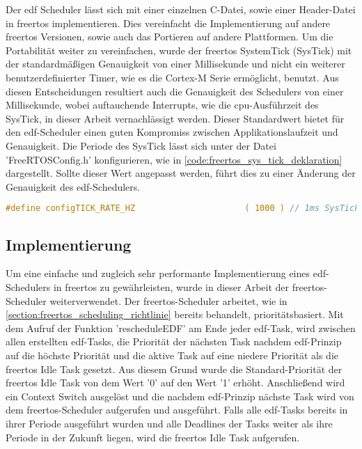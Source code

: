 \documentclass[../EDF Master Thesis.tex]{subfiles}
\begin{document}
Der \ac{edf} Scheduler lässt sich mit einer einzelnen C-Datei, sowie einer Header-Datei in \ac{freertos} implementieren.
Dies vereinfacht die Implementierung auf andere \ac{freertos} Versionen, sowie auch das Portieren auf andere Plattformen.
Um die Portabilität weiter zu vereinfachen, wurde der \ac{freertos} SystemTick (SysTick) mit der standardmäßigen Genauigkeit von einer Millisekunde und nicht ein weiterer benutzerdefinierter Timer, wie es die Cortex-M Serie ermöglicht, benutzt.
Aus diesen Entscheidungen resultiert auch die Genauigkeit des Schedulers von einer Millisekunde, wobei auftauchende Interrupts, wie die \ac{cpu}-Ausführzeit des SysTick, in dieser Arbeit vernachlässigt werden.
Dieser Standardwert bietet für den \ac{edf}-Scheduler einen guten Kompromiss zwischen Applikationslaufzeit und Genauigkeit.
Die Periode des SysTick lässt sich unter der Datei 'FreeRTOSConfig.h' konfigurieren, wie in \autoref{code:freertos_sys_tick_deklaration} dargestellt.
Sollte dieser Wert angepasst werden, führt dies zu einer Änderung der Genauigkeit des \ac{edf}-Schedulers.

\begin{lstlisting}[language=C, caption=FreeRTOS SysTick Deklaration, label=code:freertos_sys_tick_deklaration]
    #define configTICK_RATE_HZ						( 1000 ) // 1ms SysTick
\end{lstlisting}

\subsection{Implementierung} \label{section:implementierung}
    Um eine einfache und zugleich sehr performante Implementierung eines \ac{edf}-Schedulers in \ac{freertos} zu gewährleisten, wurde in dieser Arbeit der \ac{freertos}-Scheduler weiterverwendet.
    Der \ac{freertos}-Scheduler arbeitet, wie in \autoref{section:freertos_scheduling_richtlinie} bereits behandelt, prioritätsbasiert.
    Mit dem Aufruf der Funktion 'rescheduleEDF' am Ende jeder \ac{edf}-Task, wird zwischen allen erstellten \ac{edf}-Tasks, die Priorität der nächsten Task nachdem \ac{edf}-Prinzip auf die höchste Priorität und die aktive Task auf eine niedere Priorität als die \ac{freertos} Idle Task gesetzt.
    Aus diesem Grund wurde die Standard-Priorität der \ac{freertos} Idle Task von dem Wert '0' auf den Wert '1' erhöht.
    Anschließend wird ein Context Switch ausgelöst und die nachdem \ac{edf}-Prinzip nächste Task wird von dem \ac{freertos}-Scheduler aufgerufen und ausgeführt.
    Falls alle \ac{edf}-Tasks bereits in ihrer Periode ausgeführt wurden und alle Deadlines der Tasks weiter als ihre Periode in der Zukunft liegen, wird die \ac{freertos} Idle Task aufgerufen.
\end{document}
